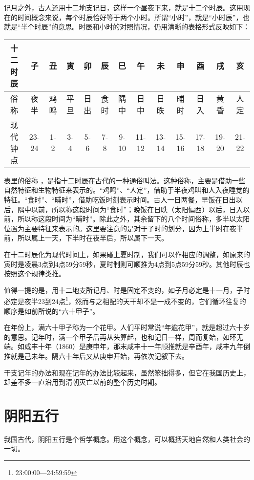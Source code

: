 \documentclass[a5paper,oneside,12pt]{ctexbook}
\begin{document}
记月之外，古人还用十二地支记日，这样一个昼夜下来，就是十二个时辰。这用现在的时间概念来说，每个时辰恰好等于两个小时。所谓“小时”，就是“小时辰”，也就是“半个时辰”的意思。时辰和小时的对照情况，仍用清晰的表格形式反映如下：

\begin{table}[H]
\setlength{\tabcolsep}{0.2em} %
\centering\footnotesize
\begin{tabular}{*{12}{c|}c}
\hline
十二时辰&子&丑&寅&卯&辰&巳&午&未&申&酉&戌&亥\\
\hline
俗称&夜半&鸡鸣&平旦&日出&食时&隅中&日中&日昳&晡时&日入&黄昏&人定\\
\hline
现代钟点\footnotemark&23-24&1-2&3-4&5-6&7-8&9-10&11-12&13-14&15-16&17-18&19-20&21-22\\
\hline
\end{tabular}
\end{table}

表里的俗称 ，是指十二时辰在古代的一种通俗叫法。这种俗称，主要是借助一些自然特征和生物特征来表示的。“鸡鸣”、“人定”，借助于半夜鸡叫和人入夜睡觉的特征。“食时”、“晡时”，借助吃饭时刻表示时间。古人一日两餐，早饭在日出以后，隅中以前，所以称这段时间为“食时”；晚饭在日昳（太阳偏西）以后，日入以前，所以称这段时间为“晡时”。除此之外，其余留下的八个时间俗称，多半以太阳位置为主要特征来表示的。这里要注意的是对于子时的划分，因为上半时在夜半前，所以属上一天，下半时在夜半后，所以属下一天。

在十二时辰化为现代时间上，如果碰上夏时制，我们可以作相应的调整，如原来的寅时是凌晨3点到4点59分59秒，夏时制则可顺推为4点到5点59分59秒。其他时辰也按照这个规律类推。

值得一提的是，用十二地支所记月、时是固定不变的，如子月必定是十一月，子时必定是夜半23到24点\footnote{23:00:00—24:59:59}，然而与之相配的天干却不是一成不变的，它们循环往复的顺序是如前所说的“六十甲子”。

在年份上，满六十甲子称为一个花甲。人们平时常说“年逾花甲”，就是超过六十岁的意思。记年时，满一个甲子后再从头算起，也和记日一样，周而复始，如环无端。如咸丰十年（1860）是庚申年，那末咸丰十一年顺推就是辛酉年，咸丰九年倒推就是己未年。隔六十年后又从庚申开始，再依次记叙下去。

干支记年的办法和现在记年的办法比较起来，虽然笨拙得多，但它在我国历史上，却差不多一直沿用到清朝灭亡以前的整个历史时期。

\section{阴阳五行}
我国古代，阴阳五行是个哲学概念。用这个概念，可以概括天地自然和人类社会的一切。
\end{document}
